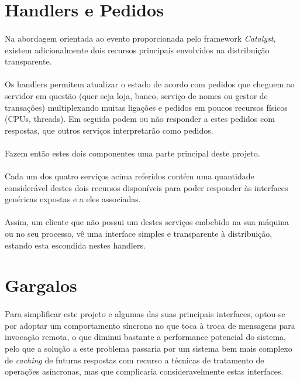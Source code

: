\documentclass[11pt,a4paper]{report}
\begin{document}
\section{Handlers e Pedidos}

\paragraph{} Na abordagem orientada ao evento proporcionada pelo framework \textit{Catalyst}, existem adicionalmente dois recursos principais envolvidos na distribuição transparente.

\paragraph{} Os handlers permitem atualizar o estado de acordo com pedidos que cheguem ao servidor em questão (quer seja loja, banco, serviço de nomes ou gestor de transações) multiplexando muitas ligações e pedidos em poucos recursos físicos (CPUs, threads). Em seguida podem ou não responder a estes pedidos com respostas, que outros serviços interpretarão como pedidos.

\paragraph{} Fazem então estes dois componentes uma parte principal deste projeto. 

\paragraph{} Cada um dos quatro serviços acima referidos contém uma quantidade considerável destes dois recursos disponíveis para poder responder às interfaces genéricas expostas e a eles associadas.

\paragraph{} Assim, um cliente que não possui um destes serviços embebido na sua máquina ou no seu processo, vê uma interface simples e transparente à distribuição, estando esta escondida nestes handlers.

\section{Gargalos}

\paragraph{} Para simplificar este projeto e algumas das suas principais interfaces, optou-se por adoptar um comportamento síncrono no que toca à troca de mensagens para invocação remota, o que diminui bastante a performance potencial do sistema, pelo que a solução a este problema passaria por um sistema bem mais complexo de \textit{caching} de futuras respostas com recurso a técnicas de tratamento de operações asíncronas, mas que complicaria consideravelmente estas interfaces.
\end{document}
